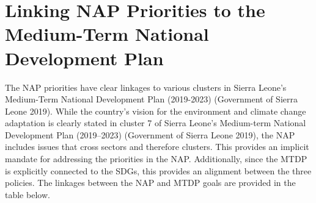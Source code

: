 \documentclass[
]{book}
\begin{document}
\hypertarget{linking-nap-priorities-to-the-medium-term-national-development-plan}{%
\section{Linking NAP Priorities to the Medium-Term National Development Plan}\label{linking-nap-priorities-to-the-medium-term-national-development-plan}}

The NAP priorities have clear linkages to various clusters in Sierra Leone's Medium-Term National Development Plan (2019-2023) (Government of Sierra Leone 2019). While the country's vision for the environment and climate change adaptation is clearly stated in cluster 7 of Sierra Leone's Medium-term National Development Plan (2019--2023) (Government of Sierra Leone 2019), the NAP includes issues that cross sectors and therefore clusters. This provides an implicit mandate for addressing the priorities in the NAP. Additionally, since the MTDP is explicitly connected to the SDGs, this provides an alignment between the three policies. The linkages between the NAP and MTDP goals are provided in the table below.

\providecommand{\docline}[3]{\noalign{\global\setlength{\arrayrulewidth}{#1}}\arrayrulecolor[HTML]{#2}\cline{#3}}

\setlength{\tabcolsep}{2pt}

\renewcommand*{\arraystretch}{1.5}
\end{document}
